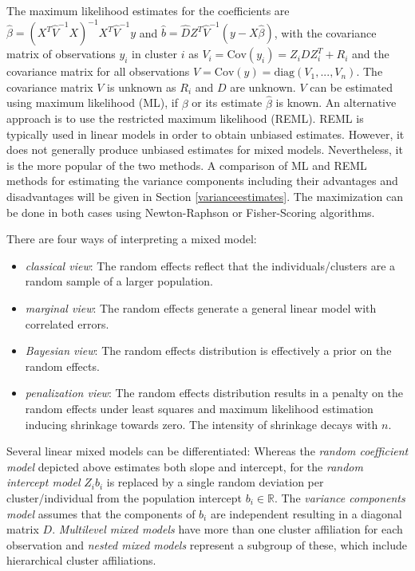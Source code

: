\documentclass[12pt]{article}
\begin{document}
The maximum likelihood estimates for the coefficients are $\hat{\beta} = (X^T \hat{V}^{-1} X)^{-1} X^T \hat{V}^{-1}y$ and $\hat{b} = \hat{D}Z^T\hat{V}^{-1} (y-X\hat{\beta})$, with the covariance matrix of observations $y_i$ in cluster $i$ as $V_i = \mathrm{Cov}(y_i) = Z_iDZ_i^T + R_i$ and the covariance matrix for all observations $V = \mathrm{Cov}(y) = \mathrm{diag}(V_1,...,V_n)$.
The covariance matrix $V$ is unknown as $R_i$ and $D$ are unknown. $V$ can be estimated  using maximum likelihood (ML), if $\beta$ or its estimate $\hat{\beta}$ is known. An alternative approach is to use the restricted  maximum likelihood  (REML). REML is typically used in linear models in order to obtain unbiased estimates. However, it does not generally produce unbiased estimates for mixed models. Nevertheless, it is the more popular of the two methods.  A comparison of ML and REML methods for estimating the variance components including their advantages and disadvantages will be given in Section \ref{varianceestimates}.  The maximization can be done in both cases using Newton-Raphson or Fisher-Scoring algorithms. 

There are four ways of interpreting a mixed model:
\begin{itemize}
\item \textit{classical view}: The random effects reflect that the individuals/clusters are a random sample of a larger population.
\item \textit{marginal view}: The random effects generate a general linear
model with correlated errors.
\item \textit{Bayesian view}: The random effects distribution is effectively a prior on the random effects.
\item \textit{penalization view}: The random effects distribution results in a penalty on the random effects under least squares and maximum likelihood estimation inducing shrinkage towards zero. The intensity of shrinkage decays with $n$.
\end{itemize}


Several linear mixed models can be differentiated:
Whereas the \textit{random coefficient model} depicted above estimates both slope and intercept, for the \textit{random intercept model} $Z_ib_i$ is replaced by a single random deviation per cluster/individual from the population intercept $b_i \in \mathbb{R}$. The \textit{variance components model} assumes that the components of $b_i$ are independent resulting in a diagonal matrix $D$.
\textit{Multilevel mixed models} have more than one cluster affiliation for each observation and \textit{nested mixed models} represent a  subgroup of these, which include hierarchical cluster affiliations.
\end{document}
